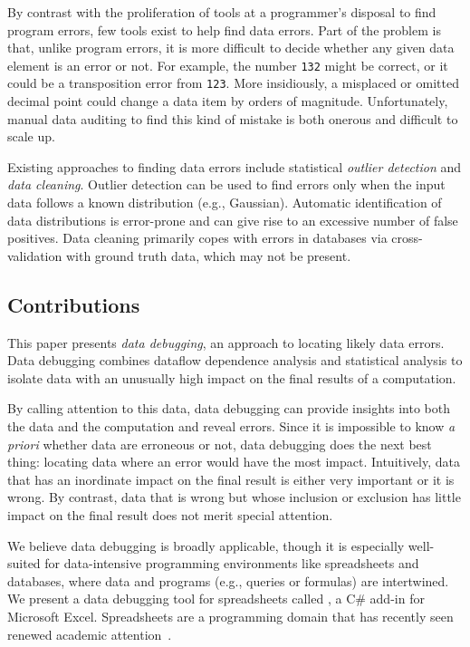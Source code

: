 By contrast with the proliferation of tools at a programmer's disposal
to find program errors, few tools exist to help find data errors. Part
of the problem is that, unlike program errors, it is more difficult to
decide whether any given data element is an error or not. For example,
the number \texttt{132} might be correct, or it could be a
transposition error from \texttt{123}. More insidiously, a misplaced
or omitted decimal point could change a data item by orders of
magnitude. Unfortunately, manual data auditing to find this kind of
mistake is both onerous and difficult to scale up.



Existing approaches to finding data errors include
statistical \emph{outlier detection} and \emph{data cleaning}. Outlier
detection can be used to find errors only when the input data follows
a known distribution (e.g., Gaussian). Automatic identification of
data distributions is error-prone and can give rise to an excessive
number of false positives. Data cleaning primarily copes with errors
in databases via cross-validation with ground truth data, which may
not be present.

\subsection*{Contributions}


This paper presents \emph{data debugging}, an approach to locating
likely data errors.  Data debugging combines dataflow dependence
analysis and statistical analysis to isolate data with an
unusually high impact on the final results of a computation.

By calling attention to this data, data debugging can provide insights
into both the data and the computation and reveal errors. Since it
is impossible to know \emph{a priori} whether data are erroneous or
not, data debugging does the next best thing: locating data where an
error would have the most impact. Intuitively, data that has an
inordinate impact on the final result is either very important or
it is wrong. By contrast, data that is wrong but whose inclusion or
exclusion has little impact on the final result does not merit special
attention.

We believe data debugging is broadly applicable, though it is
especially well-suited for data-intensive programming environments
like spreadsheets and databases, where data and programs (e.g.,
queries or formulas) are intertwined. We present a data debugging tool
for spreadsheets called \checkcell{}, a C\# add-in for Microsoft
Excel. Spreadsheets are a programming domain that has recently seen
renewed academic
attention~\cite{DBLP:conf/popl/Gulwani11,DBLP:conf/pldi/HarrisG11,Singh:2012:LSS:2212351.2212356}.


